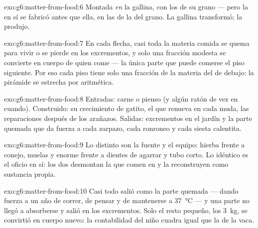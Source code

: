 \begin{solution}{exo:g6:matter-from-food:6}
Montada \emph{en} la gallina, con los  de su grano --- pero
la  en sí se fabricó antes que ella, en las  de la
 del grano. La gallina transformó; la  produjo.
\end{solution}

\begin{solution}{exo:g6:matter-from-food:7}
En cada flecha, casi toda la materia comida se quema para vivir o se
pierde en los excrementos, y solo una fracción modesta se convierte en
cuerpo de quien come --- la única parte que puede comerse el piso
siguiente. Por eso cada piso tiene solo una fracción de la materia del
de debajo: la pirámide se estrecha por aritmética.
\end{solution}

\begin{solution}{exo:g6:matter-from-food:8}
Entradas: carne o pienso (y algún ratón de vez en cuando). Construido:
su crecimiento de gatito, el  que renueva en cada muda, las
reparaciones después de los arañazos. Salidas: excrementos en el jardín
y la parte quemada que da fuerza a cada zarpazo, cada ronroneo y cada
siesta calentita.
\end{solution}

\begin{solution}{exo:g6:matter-from-food:9}
Lo distinto son la fuente y el equipo: hierba frente a conejo, muelas y
 enorme frente a dientes de agarrar y tubo corto. Lo
idéntico es el oficio en sí: los dos desmontan la  que
comen en  y la reconstruyen como sustancia propia.
\end{solution}

\begin{solution}{exo:g6:matter-from-food:10}
Casi todo salió como la parte quemada --- dando fuerza a un año de
correr, de pensar y de mantenerse a \qty{37}{\degreeCelsius} --- y una
parte no llegó a absorberse y salió en los excrementos. Solo el resto
pequeño, los \qty{3}{kg}, se convirtió en cuerpo nuevo: la contabilidad
del niño cuadra igual que la de la vaca.
\end{solution}

